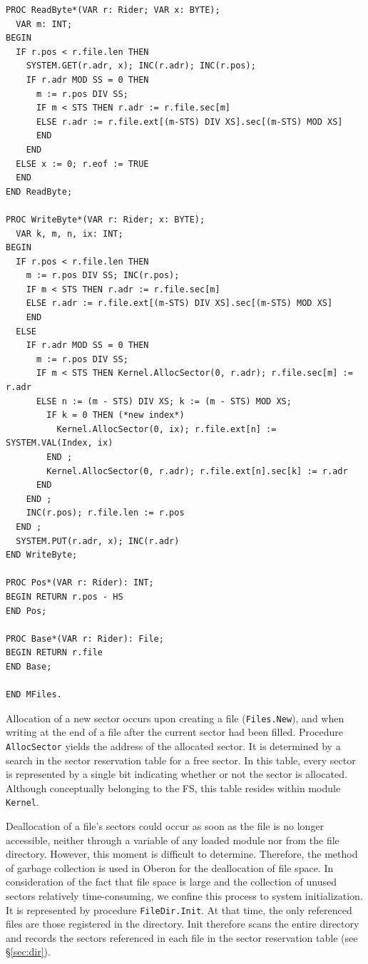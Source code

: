 \begin{verbatim}
PROC ReadByte*(VAR r: Rider; VAR x: BYTE);
  VAR m: INT;
BEGIN
  IF r.pos < r.file.len THEN
    SYSTEM.GET(r.adr, x); INC(r.adr); INC(r.pos);
    IF r.adr MOD SS = 0 THEN
      m := r.pos DIV SS;
      IF m < STS THEN r.adr := r.file.sec[m]
      ELSE r.adr := r.file.ext[(m-STS) DIV XS].sec[(m-STS) MOD XS]
      END
    END
  ELSE x := 0; r.eof := TRUE
  END
END ReadByte;

PROC WriteByte*(VAR r: Rider; x: BYTE);
  VAR k, m, n, ix: INT;
BEGIN
  IF r.pos < r.file.len THEN
    m := r.pos DIV SS; INC(r.pos);
    IF m < STS THEN r.adr := r.file.sec[m]
    ELSE r.adr := r.file.ext[(m-STS) DIV XS].sec[(m-STS) MOD XS]
    END
  ELSE
    IF r.adr MOD SS = 0 THEN
      m := r.pos DIV SS;
      IF m < STS THEN Kernel.AllocSector(0, r.adr); r.file.sec[m] := r.adr
      ELSE n := (m - STS) DIV XS; k := (m - STS) MOD XS;
        IF k = 0 THEN (*new index*)
          Kernel.AllocSector(0, ix); r.file.ext[n] := SYSTEM.VAL(Index, ix)
        END ;
        Kernel.AllocSector(0, r.adr); r.file.ext[n].sec[k] := r.adr
      END
    END ;
    INC(r.pos); r.file.len := r.pos
  END ;
  SYSTEM.PUT(r.adr, x); INC(r.adr)
END WriteByte;

PROC Pos*(VAR r: Rider): INT;
BEGIN RETURN r.pos - HS
END Pos;

PROC Base*(VAR r: Rider): File;
BEGIN RETURN r.file
END Base;

END MFiles.
\end{verbatim}

Allocation of a new sector occurs upon creating a file (\verb|Files.New|), and when writing at the end
of a file after the current sector had been filled. Procedure \verb|AllocSector| yields the address of
the allocated sector. It is determined by a search in the sector reservation table for a free sector. In
this table, every sector is represented by a single bit indicating whether or not the sector is
allocated. Although conceptually belonging to the FS, this table resides within module \verb|Kernel|.

Deallocation of a file's sectors could occur as soon as the file is no longer accessible, neither
through a variable of any loaded module nor from the file directory. However, this moment is
difficult to determine. Therefore, the method of garbage collection is used in Oberon for the
deallocation of file space. In consideration of the fact that file space is large and the collection of
unused sectors relatively time-consuming, we confine this process to system initialization. It is
represented by procedure \verb|FileDir.Init|. At that time, the only referenced files are those
registered in the directory. Init therefore scans the entire directory and records the sectors
referenced in each file in the sector reservation table (see \S \ref{sec:dir}).

